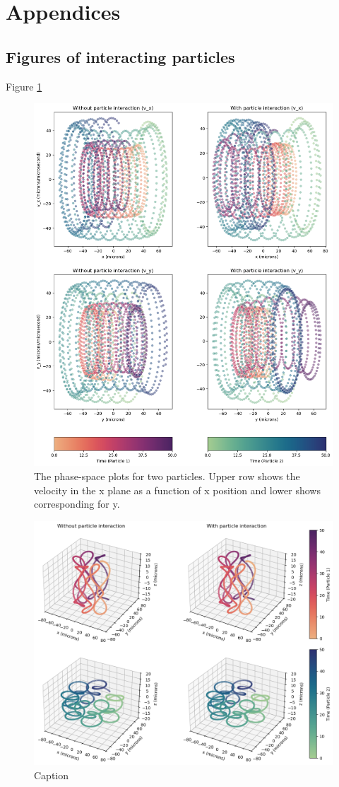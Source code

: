 \documentclass[12pt,a4paper]{article}
\begin{document}
\section{Appendices}

\subsection{Figures of interacting particles}

Figure \ref{fig:phase-space}

\begin{figure}[h!]
    \centering
    \includegraphics[width=\linewidth]{Project 3/figures/two_particles_v-vs-r.png}
    \caption{The phase-space plots for two particles. Upper row shows the velocity in the x plane as a function of x position and lower shows corresponding for y.}
    \label{fig:phase-space}
\end{figure}

\begin{figure}
    \centering
    \includegraphics[width=\linewidth]{Project 3/figures/two_particles_3d.png}
    \caption{Caption}
    \label{fig:enter-label}
\end{figure}
\end{document}
